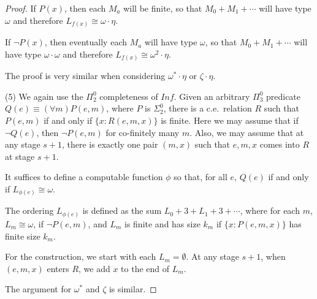 \documentclass[10pt,a4paper]{amsart}
\begin{document}
\begin{proof}
If $P(x)$, then each $M_a$ will be finite, so that $M_0 + M_1 + \cdots$ will have type $\omega$ and therefore $L_{f(x)} \cong \omega \cdot \eta$. 

If $\neg P(x)$, then eventually each $M_a$ will have type $\omega$,  so that $M_0 + M_1 + \cdots$ will have type $\omega \cdot \omega$ and therefore $L_{f(x)} \cong \omega^2 \cdot \eta$. 

The proof is very similar when considering $\omega^*\cdot\eta$ or $\zeta\cdot\eta$.

\medskip

(5) We again use the $\Pi^0_2$ completeness of $Inf$. Given an arbitrary $\Pi^0_3$ predicate $Q(e) \equiv (\forall m) P(e,m)$, where $P$ is $\Sigma^0_2$, there is a c.e.\ relation $R$ such that $P(e,m)$ if and only if $\{x: R(e,m,x)\}$ is finite. Here we may assume that if $\neg Q(e)$, then $\neg P(e,m)$ for co-finitely many $m$. Also, we may assume that at any stage $s+1$, there is exactly one pair $(m,x)$ such that $e,m,x$ comes into $R$ at stage $s+1$. 

It suffices to define a computable function $\phi$ so that, for all $e$, $Q(e)$ if and only if $L_{\phi(e)} \cong \omega$. 

The ordering $L_{\phi(e)}$ is defined as the sum $L_0 + 3 + L_1 + 3 +  \dotsb$, where for each $m$, $L_m \cong \omega$, if $\neg P(e,m)$, and $L_m$ is finite and has size $k_m$ if $\{x: P(e,m,x)\}$ has finite size $k_m$. 

For the construction, we start with each $L_m = \emptyset$.  At any stage $s+1$,
when $(e,m,x)$ enters $R$, we add $x$ to the end of $L_m$. 

The argument for $\omega^*$ and $\zeta$ is similar. 

\end{proof}
\end{document}
